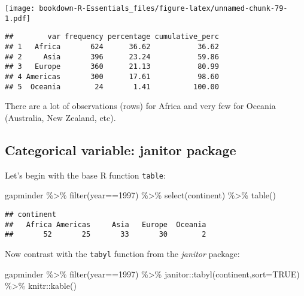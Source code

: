 \documentclass[
]{book}
\newenvironment{Shaded}{\begin{snugshade}}{\end{snugshade}}
\newcommand{\AttributeTok}[1]{\textcolor[rgb]{0.77,0.63,0.00}{#1}}
\newcommand{\ConstantTok}[1]{\textcolor[rgb]{0.00,0.00,0.00}{#1}}
\newcommand{\DecValTok}[1]{\textcolor[rgb]{0.00,0.00,0.81}{#1}}
\newcommand{\FunctionTok}[1]{\textcolor[rgb]{0.00,0.00,0.00}{#1}}
\newcommand{\NormalTok}[1]{#1}
\newcommand{\SpecialCharTok}[1]{\textcolor[rgb]{0.00,0.00,0.00}{#1}}
\begin{document}
\texttt{[image: bookdown-R-Essentials\_files/figure-latex/unnamed-chunk-79-1.pdf]}

\begin{verbatim}
##        var frequency percentage cumulative_perc
## 1   Africa       624      36.62           36.62
## 2     Asia       396      23.24           59.86
## 3   Europe       360      21.13           80.99
## 4 Americas       300      17.61           98.60
## 5  Oceania        24       1.41          100.00
\end{verbatim}

There are a lot of observations (rows) for Africa and very few for Oceania (Australia, New Zealand, etc).

\hypertarget{categorical-variable-janitor-package}{%
\subsection{Categorical variable: janitor package}\label{categorical-variable-janitor-package}}

Let's begin with the base R function \texttt{table}:

\begin{Shaded}
\begin{Highlighting}[]
\NormalTok{gapminder }\SpecialCharTok{\%\textgreater{}\%} 
  \FunctionTok{filter}\NormalTok{(year}\SpecialCharTok{==}\DecValTok{1997}\NormalTok{) }\SpecialCharTok{\%\textgreater{}\%}
  \FunctionTok{select}\NormalTok{(continent) }\SpecialCharTok{\%\textgreater{}\%}
  \FunctionTok{table}\NormalTok{()}
\end{Highlighting}
\end{Shaded}

\begin{verbatim}
## continent
##   Africa Americas     Asia   Europe  Oceania 
##       52       25       33       30        2
\end{verbatim}

Now contrast with the \texttt{tabyl} function from the \emph{janitor} package:

\begin{Shaded}
\begin{Highlighting}[]
\NormalTok{gapminder }\SpecialCharTok{\%\textgreater{}\%} 
  \FunctionTok{filter}\NormalTok{(year}\SpecialCharTok{==}\DecValTok{1997}\NormalTok{) }\SpecialCharTok{\%\textgreater{}\%}
\NormalTok{  janitor}\SpecialCharTok{::}\FunctionTok{tabyl}\NormalTok{(continent,}\AttributeTok{sort=}\ConstantTok{TRUE}\NormalTok{) }\SpecialCharTok{\%\textgreater{}\%}
\NormalTok{  knitr}\SpecialCharTok{::}\FunctionTok{kable}\NormalTok{()}
\end{Highlighting}
\end{Shaded}
\end{document}
